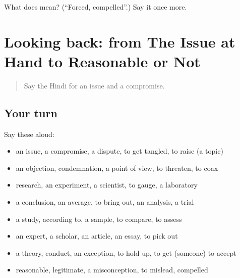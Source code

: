 \begin{tcolorbox}[breakable,colback=teal!4,colframe=teal!35!black,title={Before you move on}]
What does  mean? (\textquotedblleft{}Forced, compelled\textquotedblright{}.) Say it once more.
\end{tcolorbox}
\section[(dialogue)]{Looking back: from The Issue at Hand to Reasonable or Not}

\label{lesson:HI-R366-review-359-366}



\begin{quote}
Say the Hindi for an issue and a compromise.
\end{quote}

\subsection*{Your turn}
Say these aloud:

\begin{itemize}
\raggedright
  \item an issue, a compromise, a dispute, to get tangled, to raise (a topic)
  \item an objection, condemnation, a point of view, to threaten, to coax
  \item research, an experiment, a scientist, to gauge, a laboratory
  \item a conclusion, an average, to bring out, an analysis, a trial
  \item a study, according to, a sample, to compare, to assess
  \item an expert, a scholar, an article, an essay, to pick out
  \item a theory, conduct, an exception, to hold up, to get (someone) to accept
  \item reasonable, legitimate, a misconception, to mislead, compelled
\end{itemize}

